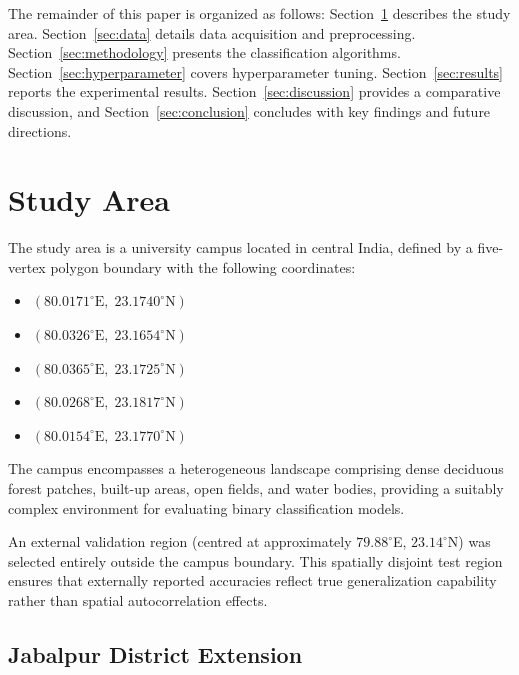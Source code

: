 \documentclass[12pt, a4paper, twocolumn]{article}
\begin{document}
The remainder of this paper is organized as follows: Section~\ref{sec:study_area} describes the study area. Section~\ref{sec:data} details data acquisition and preprocessing. Section~\ref{sec:methodology} presents the classification algorithms. Section~\ref{sec:hyperparameter} covers hyperparameter tuning. Section~\ref{sec:results} reports the experimental results. Section~\ref{sec:discussion} provides a comparative discussion, and Section~\ref{sec:conclusion} concludes with key findings and future directions.

\section{Study Area}
\label{sec:study_area}

The study area is a university campus located in central India, defined by a five-vertex polygon boundary with the following coordinates:

\begin{itemize}
    \item $(80.0171^{\circ}\text{E},\; 23.1740^{\circ}\text{N})$
    \item $(80.0326^{\circ}\text{E},\; 23.1654^{\circ}\text{N})$
    \item $(80.0365^{\circ}\text{E},\; 23.1725^{\circ}\text{N})$
    \item $(80.0268^{\circ}\text{E},\; 23.1817^{\circ}\text{N})$
    \item $(80.0154^{\circ}\text{E},\; 23.1770^{\circ}\text{N})$
\end{itemize}

The campus encompasses a heterogeneous landscape comprising dense deciduous forest patches, built-up areas, open fields, and water bodies, providing a suitably complex environment for evaluating binary classification models.

An external validation region (centred at approximately $79.88^{\circ}$E, $23.14^{\circ}$N) was selected entirely outside the campus boundary. This spatially disjoint test region ensures that externally reported accuracies reflect true generalization capability rather than spatial autocorrelation effects.

\subsection{Jabalpur District Extension}
\label{subsec:jabalpur}
\end{document}
